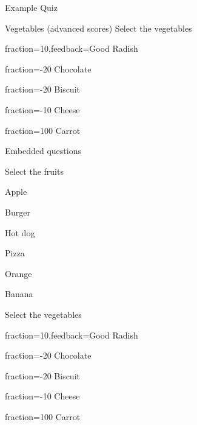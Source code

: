 \documentclass{article}
\begin{document}
\begin{quiz}[multiple]{Example Quiz}
\begin{multi}{Vegetables (advanced scores)}
Select the vegetables
\item[fraction=10,feedback={Good}] Radish%
\item[fraction=-20] Chocolate%
\item[fraction=-20] Biscuit%
\item[fraction=-10] Cheese%
\item[fraction=100] Carrot%
\end{multi}
\begin{cloze}{Embedded questions}
\begin{multi}%
Select the fruits
\item* Apple%
\item Burger%
\item Hot dog%
\item Pizza%
\item* Orange%
\item* Banana%
\end{multi}

\begin{multi}%
Select the vegetables
\item[fraction=10,feedback={Good}] Radish%
\item[fraction=-20] Chocolate%
\item[fraction=-20] Biscuit%
\item[fraction=-10] Cheese%
\item[fraction=100] Carrot%
\end{multi}
\end{cloze}
\end{quiz}
\end{document}
